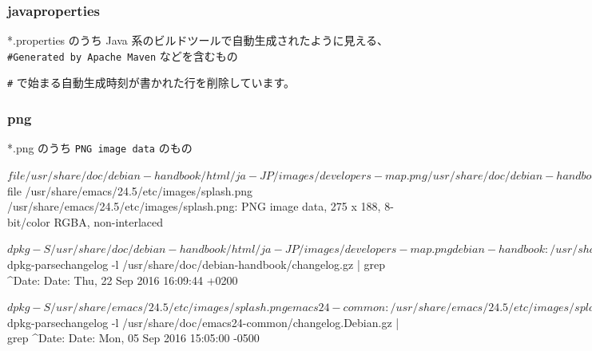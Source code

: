 \documentclass[mingoth,a4paper]{jsarticle}
\begin{document}
\subsubsection{javaproperties}
*.properties のうち Java 系のビルドツールで自動生成されたように見える、
\verb|#Generated by Apache Maven| などを含むもの


\verb|#| で始まる自動生成時刻が書かれた行を削除しています。

\subsubsection{png}
*.png のうち \verb|PNG image data| のもの

\begin{commandline}
$ file /usr/share/doc/debian-handbook/html/ja-JP/images/developers-map.png
/usr/share/doc/debian-handbook/html/ja-JP/images/developers-map.png: PNG image data, 750 x 450, 8-bit/color RGB, non-interlaced
$ file /usr/share/emacs/24.5/etc/images/splash.png
/usr/share/emacs/24.5/etc/images/splash.png: PNG image data, 275 x 188, 8-bit/color RGBA, non-interlaced
\end{commandline}

\begin{commandline}
$ dpkg -S /usr/share/doc/debian-handbook/html/ja-JP/images/developers-map.png
debian-handbook: /usr/share/doc/debian-handbook/html/ja-JP/images/developers-map.png
$ dpkg-parsechangelog -l /usr/share/doc/debian-handbook/changelog.gz | grep ^Date:
Date: Thu, 22 Sep 2016 16:09:44 +0200
\end{commandline}

\begin{commandline}
$ dpkg -S /usr/share/emacs/24.5/etc/images/splash.png
emacs24-common: /usr/share/emacs/24.5/etc/images/splash.png
$ dpkg-parsechangelog -l /usr/share/doc/emacs24-common/changelog.Debian.gz | grep ^Date:
Date: Mon, 05 Sep 2016 15:05:00 -0500
\end{commandline}
\end{document}
